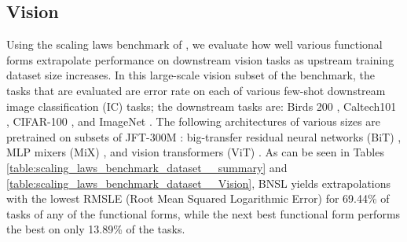\documentclass{article} %
\begin{document}
\FloatBarrier
\vspace{-3.6mm}
\subsection{Vision}
\vspace{-3.6mm}
\label{section:scaling_benchmark__vision}


Using the scaling laws benchmark of \cite{Alabdulmohsi2022revisiting}, we evaluate how well various functional forms extrapolate performance on downstream vision tasks as upstream training dataset size increases. In this large-scale vision subset of the benchmark, the tasks that are evaluated are error rate on each of various few-shot downstream image classification (IC) tasks; the downstream tasks are: Birds 200 \citep{welinder2010caltech}, Caltech101 \citep{fei2004learning}, CIFAR-100 \citep{krizhevsky2009learning}, and ImageNet \citep{deng2009imagenet}. The following architectures of various sizes are pretrained on subsets of JFT-300M \citep{sun2017revisiting}: big-transfer residual neural networks (BiT) \citep{kolesnikov2020big}, MLP mixers (MiX) \citep{tolstikhin2021mlp}, and vision transformers (ViT) \citep{dosovitskiy2020image}. As can be seen in Tables  \ref{table:scaling_laws_benchmark_dataset__summary} and \ref{table:scaling_laws_benchmark_dataset__Vision}, BNSL yields extrapolations with the lowest RMSLE (Root Mean Squared Logarithmic Error) for 69.44\% of tasks of any of the functional forms, while the next best functional form performs the best on only 13.89\% of the tasks.

\vspace{-1.6mm}
\end{document}
